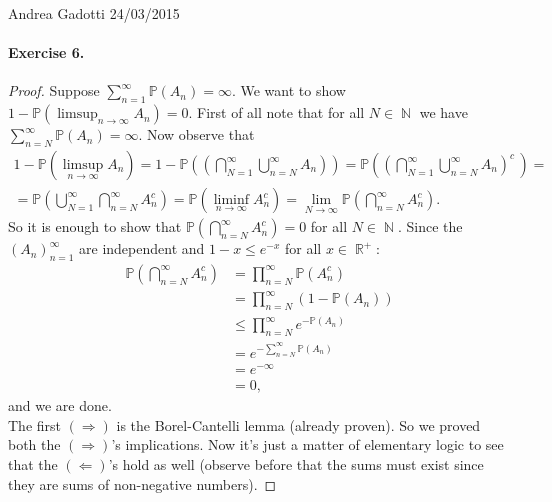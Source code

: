 \documentclass[12pt,a4paper]{report}
\theoremstyle{definition}
\theoremstyle{num.custom-title}
\DeclareMathOperator{\N}{\mathbb{N}}
\DeclareMathOperator{\R}{\mathbb{R}}
\renewcommand{\1}{\mathbbm{1}}
\renewcommand{\P}{\mathbb{P}}
\begin{document}
\noindent Andrea Gadotti \hfill 24/03/2015

\paragraph{Exercise 6.}
\begin{proof}
Suppose $\sum^{\infty}_{n=1}\P(A_n)=\infty$. We want to show $1-\P(\limsup_{n \rightarrow \infty} A_n) = 0$. First of all note that for all $N \in \N$ we have $\sum^{\infty}_{n=N}\P(A_n)=\infty$. Now observe that
\begin{multline*}
1 - \P(\limsup_{n \rightarrow \infty} A_n)  = 
1 - \P\left(\left(\bigcap_{N=1}^{\infty} \bigcup_{n=N}^{\infty}A_n\right)\right) =
\P\left(\left(\bigcap_{N=1}^{\infty} \bigcup_{n=N}^{\infty}A_n\right)^c \, \right) =\\
=\P\left(\bigcup_{N=1}^{\infty} \bigcap_{n=N}^{\infty}A_n^{c}\right)
= \P\left(\liminf_{n \rightarrow \infty}A_n^{c}\right)= \lim_{N \rightarrow \infty}\P\left(\bigcap_{n=N}^{\infty}A_n^{c}\right).
\end{multline*}
So it is enough to show that $\P\left(\bigcap_{n=N}^{\infty}A_n^{c}\right) = 0$ for all $N \in \N$. Since the $(A_n)^{\infty}_{n = 1}$ are independent and $1-x \leq e^{-x}$ for all $x \in \R^+$:
\begin{align*}
\P\left(\bigcap_{n=N}^{\infty}A_n^{c}\right) 
&= \prod^{\infty}_{n=N}\P\left(A_n^{c}\right) \\
&= \prod^{\infty}_{n=N}\left(1-\P\left(A_n\right)\right) \\
&\leq \prod^{\infty}_{n=N}e^{-\P(A_n)}\\
&=e^{-\sum^{\infty}_{n=N}\P(A_n)}\\
&=e^{-\infty}\\
&= 0,
\end{align*}
and we are done.\\
The first $(\Longrightarrow)$ is the Borel-Cantelli lemma (already proven). So we proved both the $(\Longrightarrow)$'s implications. Now it's just a matter of elementary logic to see that the $(\Longleftarrow)$'s hold as well (observe before that the sums must exist since they are sums of non-negative numbers).
\end{proof}
\end{document}
